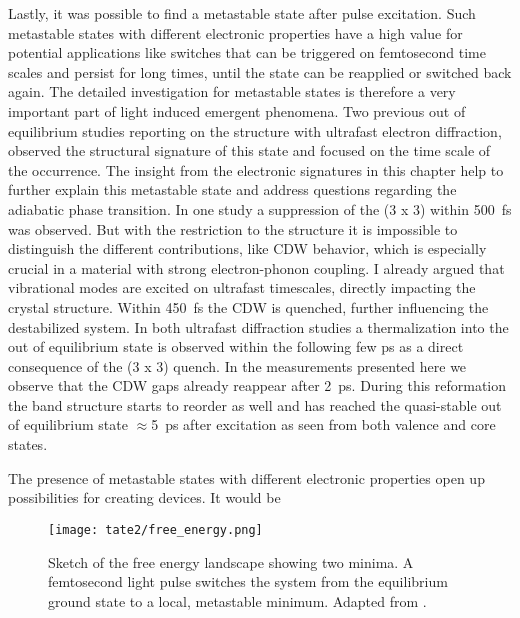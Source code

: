 Lastly, it was possible to find a metastable state after pulse excitation.
Such metastable states with different electronic properties have a high value for potential applications like switches that can be triggered on femtosecond time scales and persist for long times, until the state can be reapplied or switched back again.
The detailed investigation for metastable states is therefore a very important part of light induced emergent phenomena.
Two previous out of equilibrium studies reporting on the structure with ultrafast electron diffraction, observed the structural signature of this state and focused on the time scale of the occurrence.
The insight from the electronic signatures in this chapter help to further explain this metastable state and address questions regarding the adiabatic phase transition.
In one study \cite{domrose_femtosecond_2024} a suppression of the (3 x 3) within \qty{500}{\femto\second} was observed.
But with the restriction to the structure it is impossible to distinguish the different contributions, like CDW behavior, which is especially crucial in a material with strong electron-phonon coupling.
I already argued that vibrational modes are excited on ultrafast timescales, directly impacting the crystal structure.
Within \qty{450}{\femto\second} the CDW is quenched, further influencing the destabilized system.
In both ultrafast diffraction studies a thermalization into the out of equilibrium state is observed within the following few \unit{\pico\second} as a direct consequence of the (3 x 3) quench.
In the measurements presented here we observe that the CDW gaps already reappear after \qty{2}{\pico\second}.
During this reformation the band structure starts to reorder as well and has reached the quasi-stable out of equilibrium state $\approx$\qty{5}{\pico\second} after excitation as seen from both valence and core states.

The presence of metastable states with different electronic properties open up possibilities for creating devices.
It would be

\begin{figure}
	\centering
	\texttt{[image: tate2/free\_energy.png]}
	\caption{Sketch of the free energy landscape showing two minima. A femtosecond light pulse switches the system from the equilibrium ground state to a local, metastable minimum. Adapted from \cite{basov_towards_2017}.}
	\label{fig:free_energy}
\end{figure}

